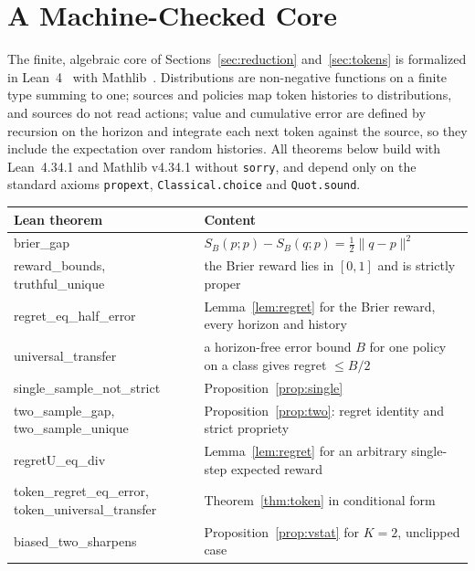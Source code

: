 \documentclass[11pt]{article}
\theoremstyle{definition}
\begin{document}
\section{A Machine-Checked Core}\label{sec:lean}

The finite, algebraic core of Sections~\ref{sec:reduction} and~\ref{sec:tokens} is formalized in Lean~4~\cite{demoura2021lean4} with Mathlib~\cite{mathlib2020}. Distributions are non-negative functions on a finite type summing to one; sources and policies map token histories to distributions, and sources do not read actions; value and cumulative error are defined by recursion on the horizon and integrate each next token against the source, so they include the expectation over random histories. All theorems below build with Lean~4.34.1 and Mathlib v4.34.1 without \texttt{sorry}, and depend only on the standard axioms \texttt{propext}, \texttt{Classical.choice} and \texttt{Quot.sound}.

\begin{center}
\small
\begin{tabular}{>{\ttfamily\raggedright}p{5.4cm}>{\raggedright\arraybackslash}p{9.2cm}}
\toprule
\normalfont Lean theorem & Content \\
\midrule
brier\_gap & $S_B(p;p)-S_B(q;p)=\frac12\|q-p\|^2$ \\
reward\_bounds, truthful\_unique & the Brier reward lies in $[0,1]$ and is strictly proper \\
regret\_eq\_half\_error & Lemma~\ref{lem:regret} for the Brier reward, every horizon and history \\
universal\_transfer & a horizon-free error bound $B$ for one policy on a class gives regret $\le B/2$ \\
single\_sample\_not\_strict & Proposition~\ref{prop:single} \\
two\_sample\_gap, two\_sample\_unique & Proposition~\ref{prop:two}: regret identity and strict propriety \\
regretU\_eq\_div & Lemma~\ref{lem:regret} for an arbitrary single-step expected reward \\
token\_regret\_eq\_error, token\_universal\_transfer & Theorem~\ref{thm:token} in conditional form \\
biased\_two\_sharpens & Proposition~\ref{prop:vstat} for $K=2$, unclipped case \\
\bottomrule
\end{tabular}
\end{center}
\end{document}
